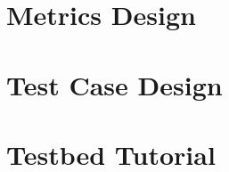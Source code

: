 \documentclass{book}
\begin{document}
\chapter{Metrics Design}
\label{chap:benchmark_design}


\chapter{Test Case Design}

\label{chap:textbed_environment}

\chapter{Testbed Tutorial}

\label{chap:tutorial}



\end{document}
